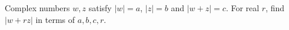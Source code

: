 Complex numbers $w,z$ satisfy $|w|=a$, $|z|=b$ and $|w+z|=c$. For real $r$, find $|w+rz|$ in terms of $a,b,c,r$.

